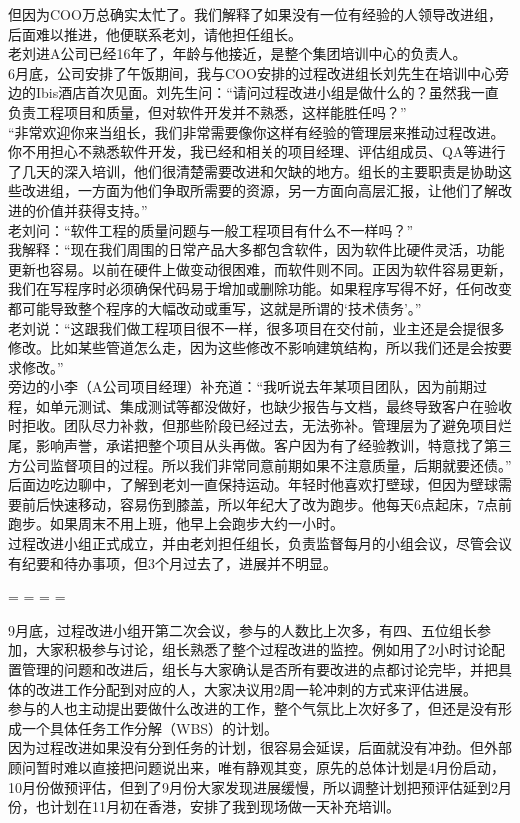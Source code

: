 但因为COO万总确实太忙了。我们解释了如果没有一位有经验的人领导改进组，后面难以推进，他便联系老刘，请他担任组长。\\
老刘进A公司已经16年了，年龄与他接近，是整个集团培训中心的负责人。\\
6月底，公司安排了午饭期间，我与COO安排的过程改进组长刘先生在培训中心旁边的Ibis酒店首次见面。刘先生问：``请问过程改进小组是做什么的？虽然我一直负责工程项目和质量，但对软件开发并不熟悉，这样能胜任吗？''\\
``非常欢迎你来当组长，我们非常需要像你这样有经验的管理层来推动过程改进。你不用担心不熟悉软件开发，我已经和相关的项目经理、评估组成员、QA等进行了几天的深入培训，他们很清楚需要改进和欠缺的地方。组长的主要职责是协助这些改进组，一方面为他们争取所需要的资源，另一方面向高层汇报，让他们了解改进的价值并获得支持。''\\
老刘问：``软件工程的质量问题与一般工程项目有什么不一样吗？''\\
我解释：``现在我们周围的日常产品大多都包含软件，因为软件比硬件灵活，功能更新也容易。以前在硬件上做变动很困难，而软件则不同。正因为软件容易更新，我们在写程序时必须确保代码易于增加或删除功能。如果程序写得不好，任何改变都可能导致整个程序的大幅改动或重写，这就是所谓的`技术债务'。''\\
老刘说：``这跟我们做工程项目很不一样，很多项目在交付前，业主还是会提很多修改。比如某些管道怎么走，因为这些修改不影响建筑结构，所以我们还是会按要求修改。''\\
旁边的小李（A公司项目经理）补充道：``我听说去年某项目团队，因为前期过程，如单元测试、集成测试等都没做好，也缺少报告与文档，最终导致客户在验收时拒收。团队尽力补救，但那些阶段已经过去，无法弥补。管理层为了避免项目烂尾，影响声誉，承诺把整个项目从头再做。客户因为有了经验教训，特意找了第三方公司监督项目的过程。所以我们非常同意前期如果不注意质量，后期就要还债。''\\
后面边吃边聊中，了解到老刘一直保持运动。年轻时他喜欢打壁球，但因为壁球需要前后快速移动，容易伤到膝盖，所以年纪大了改为跑步。他每天6点起床，7点前跑步。如果周末不用上班，他早上会跑步大约一小时。\\
过程改进小组正式成立，并由老刘担任组长，负责监督每月的小组会议，尽管会议有纪要和待办事项，但3个月过去了，进展并不明显。

\begin{description}
\tightlist
\item[]
= = = =
\end{description}

9月底，过程改进小组开第二次会议，参与的人数比上次多，有四、五位组长参加，大家积极参与讨论，组长熟悉了整个过程改进的监控。例如用了2小时讨论配置管理的问题和改进后，组长与大家确认是否所有要改进的点都讨论完毕，并把具体的改进工作分配到对应的人，大家决议用2周一轮冲刺的方式来评估进展。\\
参与的人也主动提出要做什么改进的工作，整个气氛比上次好多了，但还是没有形成一个具体任务工作分解（WBS）的计划。\\
因为过程改进如果没有分到任务的计划，很容易会延误，后面就没有冲劲。但外部顾问暂时难以直接把问题说出来，唯有静观其变，原先的总体计划是4月份启动，10月份做预评估，但到了9月份大家发现进展缓慢，所以调整计划把预评估延到2月份，也计划在11月初在香港，安排了我到现场做一天补充培训。

